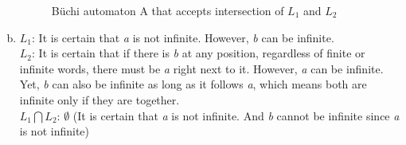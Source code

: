 \documentclass{article}
\begin{document}
\begin{enumerate}[(a)]
\begin{figure}[ht]
        \caption{Büchi automaton A that accepts intersection of $L_1$ and $L_2$ }
        \label{fig:state-machine-l1}
    \end{figure}


    \item{
        $L_1$: It is certain that \textit{a} is not infinite. However, \textit{b} can be infinite.\\
        $L_2$: It is certain that if there is \textit{b} at any position, regardless of finite or infinite words, there must be \textit{a} right next to it. However, \textit{a} can be infinite. Yet, \textit{b} can also be infinite as long as it follows \textit{a}, which means both are infinite only if they are together.\\
        $L_1 \bigcap L_2$: $\emptyset$ (It is certain that \textit{a} is not infinite. And \textit{b} cannot be infinite since \textit{a} is not infinite)
    }
    
\end{enumerate}

\newpage
\end{document}
